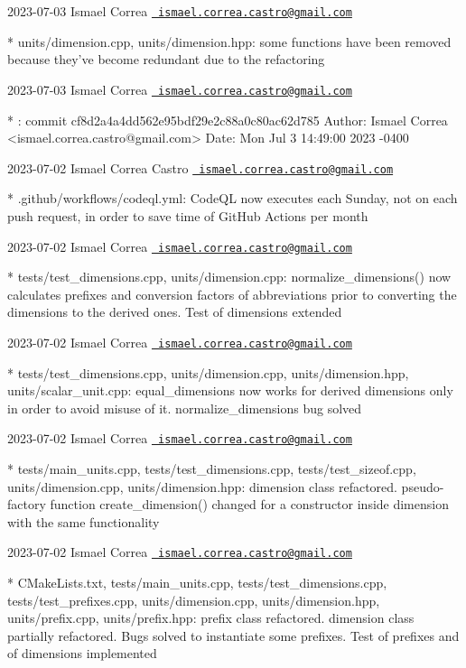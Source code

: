  2023-\/07-\/03 Ismael Correa \href{mailto:ismael.correa.castro@gmail.com}{\texttt{ ismael.\+correa.\+castro@gmail.\+com}} \begin{DoxyVerb}* units/dimension.cpp, units/dimension.hpp: some functions have been
removed because they've become redundant due to the refactoring
\end{DoxyVerb}
 2023-\/07-\/03 Ismael Correa \href{mailto:ismael.correa.castro@gmail.com}{\texttt{ ismael.\+correa.\+castro@gmail.\+com}} \begin{DoxyVerb}* : commit cf8d2a4a4dd562e95bdf29e2c88a0c80ac62d785 Author: Ismael
Correa <ismael.correa.castro@gmail.com> Date:   Mon Jul 3 14:49:00
2023 -0400
\end{DoxyVerb}
 2023-\/07-\/02 Ismael Correa Castro \href{mailto:ismael.correa.castro@gmail.com}{\texttt{ ismael.\+correa.\+castro@gmail.\+com}} \begin{DoxyVerb}* .github/workflows/codeql.yml: CodeQL now executes each Sunday, not
on each push request, in order to save time of GitHub Actions per
month
\end{DoxyVerb}
 2023-\/07-\/02 Ismael Correa \href{mailto:ismael.correa.castro@gmail.com}{\texttt{ ismael.\+correa.\+castro@gmail.\+com}} \begin{DoxyVerb}* tests/test_dimensions.cpp, units/dimension.cpp: 
normalize_dimensions() now calculates prefixes and conversion
factors of abbreviations prior to converting the dimensions to the
derived ones. Test of dimensions extended
\end{DoxyVerb}
 2023-\/07-\/02 Ismael Correa \href{mailto:ismael.correa.castro@gmail.com}{\texttt{ ismael.\+correa.\+castro@gmail.\+com}} \begin{DoxyVerb}* tests/test_dimensions.cpp, units/dimension.cpp,
units/dimension.hpp, units/scalar_unit.cpp: equal_dimensions now
works for derived dimensions only in order to avoid misuse of it.
normalize_dimensions bug solved
\end{DoxyVerb}
 2023-\/07-\/02 Ismael Correa \href{mailto:ismael.correa.castro@gmail.com}{\texttt{ ismael.\+correa.\+castro@gmail.\+com}} \begin{DoxyVerb}* tests/main_units.cpp, tests/test_dimensions.cpp,
tests/test_sizeof.cpp, units/dimension.cpp, units/dimension.hpp: 
dimension class refactored. pseudo-factory function
create_dimension() changed for a constructor inside dimension with
the same functionality
\end{DoxyVerb}
 2023-\/07-\/02 Ismael Correa \href{mailto:ismael.correa.castro@gmail.com}{\texttt{ ismael.\+correa.\+castro@gmail.\+com}} \begin{DoxyVerb}* CMakeLists.txt, tests/main_units.cpp, tests/test_dimensions.cpp,
tests/test_prefixes.cpp, units/dimension.cpp, units/dimension.hpp,
units/prefix.cpp, units/prefix.hpp: prefix class refactored.
dimension class partially refactored. Bugs solved to instantiate
some prefixes. Test of prefixes and of dimensions implemented
\end{DoxyVerb}
